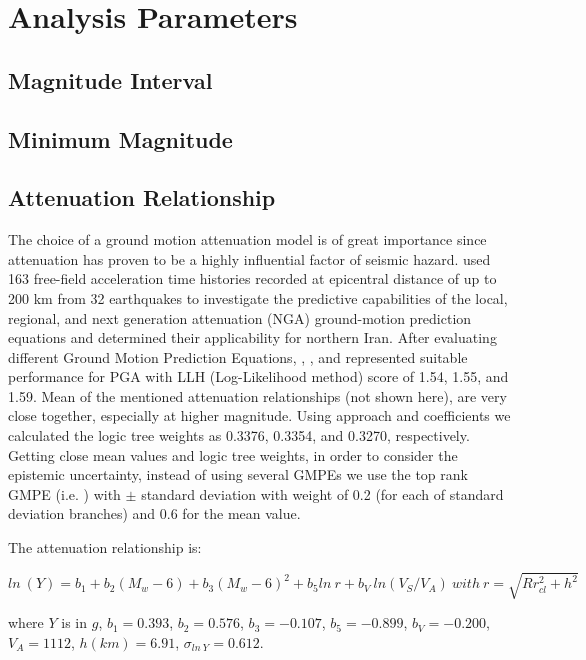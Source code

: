 \newpage
\section{Analysis Parameters}
\subsection{Magnitude Interval}
\subsection{Minimum Magnitude}
\subsection{Attenuation Relationship}
The choice of a ground motion attenuation model is of great importance since attenuation has proven to be a highly influential factor of seismic hazard. \citet{Zafarani2014} used 163 free-field acceleration time histories recorded at epicentral distance of up to 200 km from 32 earthquakes to investigate the predictive capabilities of the local, regional, and next generation attenuation (NGA) ground-motion prediction equations and determined their applicability for northern Iran. After evaluating different Ground Motion Prediction Equations, \citet{Kalkan2004}, \citet{Chiou2008}, and \citet{Boore2008} represented suitable performance for  PGA  with LLH (Log-Likelihood method) score of 1.54, 1.55, and 1.59. Mean of the mentioned attenuation relationships (not shown here), are very close together, especially at higher magnitude. Using \citet{Scherbaum2009} approach and \citet{Zafarani2014} coefficients we calculated the logic tree weights as 0.3376, 0.3354, and 0.3270, respectively. Getting close mean values and logic tree weights, in order to consider the epistemic uncertainty, instead of using several GMPEs we use the top rank GMPE (i.e.  \citet{Kalkan2004} ) with  $\pm$ standard deviation with weight of 0.2 (for each of standard deviation branches) and 0.6 for the mean value.    \\

\noindent

The attenuation relationship is:

\begin{equation}
ln\ (Y) = b_1 + b_2(M_w-6) + b_3( M_w-6)^{2}+ b_5ln\ r + b_V \ ln(V_S/V_A) \  with \  r= \sqrt{R{r^2_{cl} + h^2}}  
\end{equation}

where $Y$ is in $g$, $b_1 = 0.393$, $b_2 = 0.576$, $b_3 = -0.107$, $b_5 = -0.899$, $b_V = -0.200$, $V_A = 1112$, $h(km) = 6.91$, $\sigma_{ln\ Y} = 0.612$.


